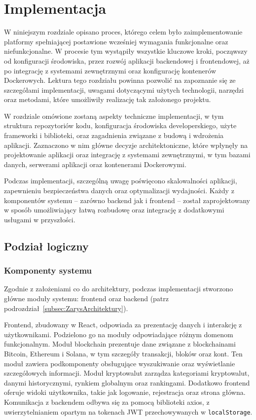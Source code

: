 \chapter{Implementacja}
W niniejszym rozdziale opisano proces, którego celem było zaimplementowanie platformy spełniającej postawione wcześniej wymagania funkcjonalne oraz niefunkcjonalne. 
W procesie tym wystąpiły wszystkie kluczowe kroki, począwszy od konfiguracji środowiska, przez rozwój aplikacji backendowej i frontendowej, aż po integrację z systemami zewnętrznymi oraz konfigurację kontenerów Dockerowych. Lektura tego rozdziału powinna pozwolić na zapoznanie się ze szczegółami implementacji, uwagami dotyczącymi użytych technologii, narzędzi oraz metodami, które umożliwiły realizację tak założonego projektu.

W rozdziale omówione zostaną aspekty techniczne implementacji, w tym struktura repozytoriów kodu, konfiguracja środowiska developerskiego, użyte frameworki i biblioteki, oraz zagadnienia związane z budową i wdrożenia aplikacji. Zaznaczono w nim główne decyzje architektoniczne, które wpłynęły na projektowanie aplikacji oraz integrację z systemami zewnętrznymi, w tym bazami danych, serwerami aplikacji oraz kontenerami Dockerowymi.

Podczas implementacji, szczególną uwagę poświęcono skalowalności aplikacji, zapewnieniu bezpieczeństwa danych oraz optymalizacji wydajności. Każdy z komponentów systemu – zarówno backend jak i frontend – został zaprojektowany w sposób umożliwiający łatwą rozbudowę oraz integrację z dodatkowymi usługami w przyszłości.


\section{Podział logiczny}
\subsection{Komponenty systemu}
Zgodnie z założeniami co do architektury, podczas implementacji stworzono główne moduły systemu: frontend oraz backend (patrz podrozdział~\ref{subsec:ZarysArchitektury}).

Frontend, zbudowany w React, odpowiada za prezentację danych i interakcję z użytkownikami. Podzielono go na moduły odpowiadające różnym domenom funkcjonalnym. Moduł blockchain prezentuje dane związane z blockchainami Bitcoin, Ethereum i Solana, w tym szczegóły transakcji, bloków oraz kont. Ten moduł zawiera podkomponenty obsługujące wyszukiwanie oraz wyświetlanie szczegółowych informacji. Moduł kryptowalut zarządza kategoriami kryptowalut, danymi historycznymi, rynkiem globalnym oraz rankingami. Dodatkowo frontend oferuje widoki użytkownika, takie jak logowanie, rejestracja oraz strona główna. Komunikacja z backendem odbywa się za pomocą biblioteki axios, z uwierzytelnianiem opartym na tokenach JWT przechowywanych w \texttt{localStorage}.

